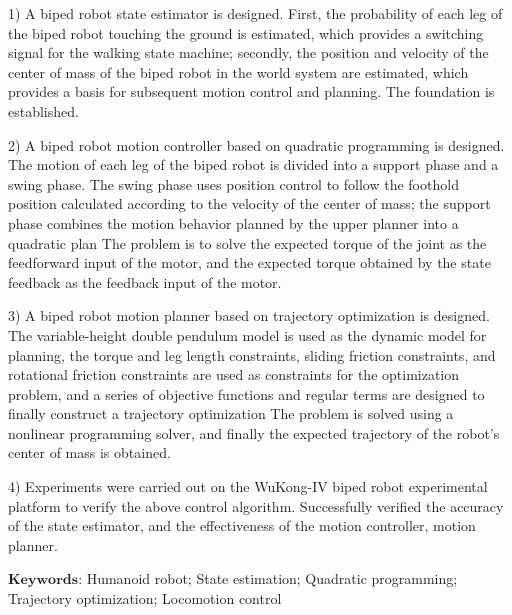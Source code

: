 1) A biped robot state estimator is designed. First, the probability of each leg of the biped robot touching the ground is estimated, 
which provides a switching signal for the walking state machine; secondly, the position and velocity of the center of mass of the biped robot in the world system are estimated, 
which provides a basis for subsequent motion control and planning. The foundation is established.

2) A biped robot motion controller based on quadratic programming is designed. The motion of each leg of the biped robot is divided into a support phase and a swing phase. 
The swing phase uses position control to follow the foothold position calculated according to the velocity of the center of mass; the support phase combines the motion behavior 
planned by the upper planner into a quadratic plan The problem is to solve the expected torque of the joint as the feedforward input of the motor, and the expected torque 
obtained by the state feedback as the feedback input of the motor.

3) A biped robot motion planner based on trajectory optimization is designed. The variable-height double pendulum model is used as the dynamic model for planning, 
the torque and leg length constraints, sliding friction constraints, and rotational friction constraints are used as constraints for the optimization problem, 
and a series of objective functions and regular terms are designed to finally construct a trajectory optimization The problem is solved using a nonlinear programming 
solver, and finally the expected trajectory of the robot's center of mass is obtained.

4) Experiments were carried out on the WuKong-IV biped robot experimental platform to verify the above control algorithm. 
Successfully verified the accuracy of the state estimator, and the effectiveness of the motion controller, motion planner.

$\textbf{Keywords}$: Humanoid robot; State estimation; Quadratic programming; Trajectory optimization; Locomotion control